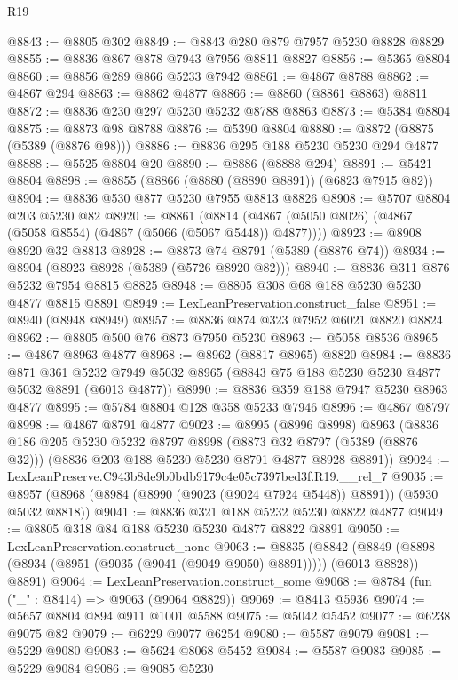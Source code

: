 \begin{lexlean}{R19}
\begin{coremodule}
@8843 := @8805 @302
@8849 := @8843 @280 @879 @7957 @5230 @8828 @8829
@8855 := @8836 @867 @878 @7943 @7956 @8811 @8827
@8856 := @5365 @8804
@8860 := @8856 @289 @866 @5233 @7942
@8861 := @4867 @8788
@8862 := @4867 @294
@8863 := @8862 @4877
@8866 := @8860 (@8861 @8863) @8811
@8872 := @8836 @230 @297 @5230 @5232 @8788 @8863
@8873 := @5384 @8804
@8875 := @8873 @98 @8788
@8876 := @5390 @8804
@8880 := @8872 (@8875 (@5389 (@8876 @98)))
@8886 := @8836 @295 @188 @5230 @5230 @294 @4877
@8888 := @5525 @8804 @20
@8890 := @8886 (@8888 @294)
@8891 := @5421 @8804
@8898 := @8855 (@8866 (@8880 (@8890 @8891)) (@6823 @7915 @82))
@8904 := @8836 @530 @877 @5230 @7955 @8813 @8826
@8908 := @5707 @8804 @203 @5230 @82
@8920 := @8861
    (@8814 (@4867 (@5050 @8026) (@4867 (@5058 @8554) (@4867 (@5066 (@5067 @5448)) @4877))))
@8923 := @8908 @8920 @32 @8813
@8928 := @8873 @74 @8791 (@5389 (@8876 @74))
@8934 := @8904 (@8923 @8928 (@5389 (@5726 @8920 @82)))
@8940 := @8836 @311 @876 @5232 @7954 @8815 @8825
@8948 := @8805 @308 @68 @188 @5230 @5230 @4877 @8815 @8891
@8949 := LexLeanPreservation.construct_false
@8951 := @8940 (@8948 @8949)
@8957 := @8836 @874 @323 @7952 @6021 @8820 @8824
@8962 := @8805 @500 @76 @873 @7950 @5230
@8963 := @5058 @8536
@8965 := @4867 @8963 @4877
@8968 := @8962 (@8817 @8965) @8820
@8984 := @8836
    @871
    @361
    @5232
    @7949
    @5032
    @8965
    (@8843 @75 @188 @5230 @5230 @4877 @5032 @8891 (@6013 @4877))
@8990 := @8836 @359 @188 @7947 @5230 @8963 @4877
@8995 := @5784 @8804 @128 @358 @5233 @7946
@8996 := @4867 @8797
@8998 := @4867 @8791 @4877
@9023 := @8995
    (@8996 @8998)
    @8963
    (@8836
      @186
      @205
      @5230
      @5232
      @8797
      @8998
      (@8873 @32 @8797 (@5389 (@8876 @32)))
      (@8836 @203 @188 @5230 @5230 @8791 @4877 @8928 @8891))
@9024 := LexLeanPreserve.C943b8de9b0bdb9179c4e05c7397bed3f.R19.__rel_7
@9035 := @8957 (@8968 (@8984 (@8990 (@9023 (@9024 @7924 @5448)) @8891)) (@5930 @5032 @8818))
@9041 := @8836 @321 @188 @5232 @5230 @8822 @4877
@9049 := @8805 @318 @84 @188 @5230 @5230 @4877 @8822 @8891
@9050 := LexLeanPreservation.construct_none
@9063 := @8835
    (@8842 (@8849 (@8898 (@8934 (@8951 (@9035 (@9041 (@9049 @9050) @8891))))) (@6013 @8828)) @8891)
@9064 := LexLeanPreservation.construct_some
@9068 := @8784 (fun ("_" : @8414) => @9063 (@9064 @8829))
@9069 := @8413 @5936
@9074 := @5657 @8804 @894 @911 @1001 @5588
@9075 := @5042 @5452
@9077 := @6238 @9075 @82
@9079 := @6229 @9077 @6254
@9080 := @5587 @9079
@9081 := @5229 @9080
@9083 := @5624 @8068 @5452
@9084 := @5587 @9083
@9085 := @5229 @9084
@9086 := @9085 @5230

\end{coremodule}
\end{lexlean}
